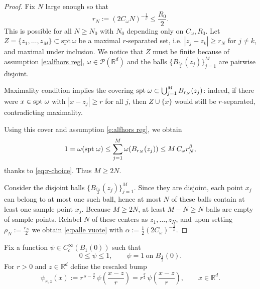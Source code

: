 \documentclass[12pt,a4paper,oneside]{amsart}
\theoremstyle{plain}
\theoremstyle{definition}
\numberwithin{equation}{section}
\numberwithin{figure}{section}
\numberwithin{table}{section}
\theoremstyle{remark}
\newcommand{\R}{\mathbb{R}}
\newcommand{\expAhlfors}{\beta}
\begin{document}
\begin{proof}
Fix $N$ large enough so that
\begin{equation}\label{eq:r-choice}
r_N:= (2C_\omega N)^{-\frac1\expAhlfors} \leq \frac{R_0}{2}.
\end{equation}
This is possible for all $N\ge N_0$ with $N_0$ depending only on $C_\omega,R_0$. Let $Z=\{z_1,\dots,z_M\}\subset\mathrm{spt}\,\omega$ be a maximal $r$-separated set, i.e.
$|z_j-z_k|\ge r_N$ for $j\neq k$, and maximal under inclusion. We notice that $Z$ must be finite because of assumption \eqref{e:alfhors reg}, $\omega \in \mathcal{P}(\R^d)$ and the balls $\{B_{\frac{r_N}{2}}(z_j)\}_{j=1}^M$ are pairwise disjoint.

Maximality condition implies the covering $\textup{spt} \; \omega\subset\bigcup_{j=1}^M B_{r_N}(z_j)$:
indeed, if there were $x\in\textup{spt} \;\omega$ with $|x-z_j|\ge r$ for all $j$, then $Z\cup\{x\}$ would still be $r$-separated,
contradicting maximality.

Using this cover and assumption \eqref{e:alfhors reg}, we obtain
\begin{equation*}
1=\omega(\textup{spt} \;\omega)\le \sum_{j=1}^M \omega(B_{r_N}(z_j))\le M\,C_\omega r_N^\expAhlfors,    
\end{equation*}
thanks to \eqref{eq:r-choice}.
Thus $M\geq 2N$. %

Consider the disjoint balls $\{B_{\frac{r_N}{2}}(z_j)\}_{j=1}^M$.
Since they are disjoint, each point $x_j$ can belong to at most one such ball,
hence at most $N$ of these balls contain at least one sample point $x_j$.
Because $M\ge 2N$, at least $M-N\ge N$ balls are empty of sample points.
Relabel $N$ of these centers as $z_1,\dots,z_N$, and upon setting
$\rho_N := \frac{r_N}{2} $ 
we obtain \eqref{e:palle vuote} with $\alpha:=\frac12(2C_\omega)^{-\frac1\expAhlfors}$.
\end{proof}

Fix a function $\psi\in C_c^\infty(B_1(0))$ such that
\begin{equation}\label{e:psi-choice}
0\le \psi\le 1,\qquad \psi= 1\ \text{on }B_{\frac12}(0).
\end{equation}
For $r>0$ and $z\in\R^d$ define the rescaled bump
\begin{equation}\label{e:psi riscalata}
\psi_{r,z}(x):=r^{\,s-\frac d2}\,\psi\!\left(\frac{x-z}{r}\right)=r^{\frac{q}{2}}\,\psi\!\left(\frac{x-z}{r}\right),\qquad x\in\R^d.
\end{equation}
\end{document}
